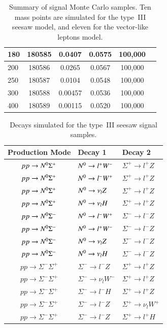 \begin{table}[htbp]
{\begin{tabular}{|l||c|c|c|c|r|}
			\hline
			180	&	180585	&	0.0407 	&	0.0575	& 100,000 \\
			\hline
			200	&	180586	&	0.0265 	&	0.0567	& 100,000 \\
			\hline
			250	&	180587	&	0.0104 	&	0.0548	& 100,000 \\
			\hline
			300	&	180588	&	0.00457	&	0.0536	& 100,000 \\
			\hline
			400	&	180589	&	0.00115	&	0.0520	& 100,000 \\
			\hline
		\end{tabular}
	}
	\caption{Summary of signal Monte Carlo samples. Ten mass points are simulated for the type~III seesaw model, and eleven for the vector-like leptons model.}
	\label{table:resonance-signal-samples}
\end{table}

\begin{table}
	\centering
	\begin{tabular}{c|ll}
		Production Mode & Decay 1 & Decay 2 \\
		\hline
		$pp \rightarrow N^{0}\Sigma^{+}$	&	$N^{0} \rightarrow l^{+} W^{-}$	&	$\Sigma^{+} \rightarrow l^{+} Z$ \\
		$pp \rightarrow N^{0}\Sigma^{+}$	&	$N^{0} \rightarrow l^{-} W^{+}$	&	$\Sigma^{+} \rightarrow l^{+} Z$ \\
		$pp \rightarrow N^{0}\Sigma^{+}$	&	$N^{0} \rightarrow \nu_{l} Z$		&	$\Sigma^{+} \rightarrow l^{+} Z$ \\
		$pp \rightarrow N^{0}\Sigma^{+}$	&	$N^{0} \rightarrow \nu_{l} H$		&	$\Sigma^{+} \rightarrow l^{+} Z$ \\
		$pp \rightarrow N^{0}\Sigma^{-}$	&	$N^{0} \rightarrow l^{-} W^{+}$	&	$\Sigma^{-} \rightarrow l^{-} Z$ \\
		$pp \rightarrow N^{0}\Sigma^{-}$	&	$N^{0} \rightarrow l^{+} W^{-}$	&	$\Sigma^{-} \rightarrow l^{-} Z$ \\
		$pp \rightarrow N^{0}\Sigma^{-}$	&	$N^{0} \rightarrow \nu_{l} Z$		&	$\Sigma^{-} \rightarrow l^{-} Z$ \\
		$pp \rightarrow N^{0}\Sigma^{-}$	&	$N^{0} \rightarrow \nu_{l} H$		&	$\Sigma^{-} \rightarrow l^{-} Z$ \\
		$pp \rightarrow \Sigma^{-}\Sigma^{+}$	&	$\Sigma^{-} \rightarrow l^{-} Z$		&	$\Sigma^{+} \rightarrow l^{+} Z$ \\
		$pp \rightarrow \Sigma^{-}\Sigma^{+}$	&	$\Sigma^{-} \rightarrow \nu_{l} W^{-}$	&	$\Sigma^{+} \rightarrow l^{+} Z$ \\
		$pp \rightarrow \Sigma^{-}\Sigma^{+}$	&	$\Sigma^{-} \rightarrow l^{-} H$		&	$\Sigma^{+} \rightarrow l^{+} Z$ \\
		$pp \rightarrow \Sigma^{-}\Sigma^{+}$	&	$\Sigma^{-} \rightarrow l^{-} Z$		&	$\Sigma^{+} \rightarrow \nu_{l} W^{+}$ \\
		$pp \rightarrow \Sigma^{-}\Sigma^{+}$	&	$\Sigma^{-} \rightarrow l^{-} Z$		&	$\Sigma^{+} \rightarrow l^{+} H$ \\
	\end{tabular}
	\caption{Decays simulated for the type~III seesaw signal samples.}
	\label{table:resonance-seesaw-sample-decays}
\end{table}



